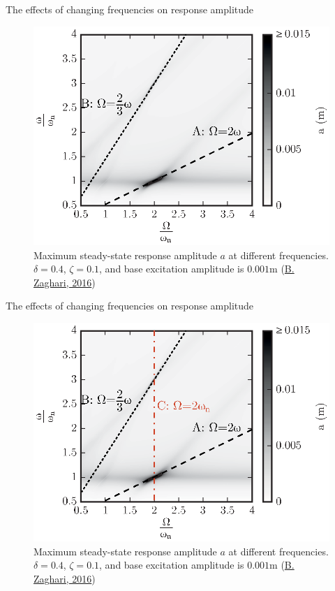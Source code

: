 \documentclass[LaTeX2e,10pt]{beamer}
\begin{document}
\begin{frame}{The effects of changing frequencies on response amplitude}
\begin{figure}
\includegraphics[width=0.7\linewidth]{Images/HighDamping_Amplitude_3.eps}
\caption{Maximum steady-state response amplitude $a$ at different frequencies. $\delta = 0.4$, $\zeta = 0.1$, and base excitation amplitude is $0.001$m (\href{https://eprints.soton.ac.uk/411397/1/BaharehZaghariPhDThesis.pdf}{B. Zaghari, 2016})}
\end{figure}
\end{frame}
\begin{frame}{The effects of changing frequencies on response amplitude}
\begin{figure}
\includegraphics[width=0.7\linewidth]{Images/HighDamping_Amplitude_4.eps}
\caption{Maximum steady-state response amplitude $a$ at different frequencies. $\delta = 0.4$, $\zeta = 0.1$, and base excitation amplitude is $0.001$m (\href{https://eprints.soton.ac.uk/411397/1/BaharehZaghariPhDThesis.pdf}{B. Zaghari, 2016})} 
\end{figure}
\end{frame}
\end{document}
